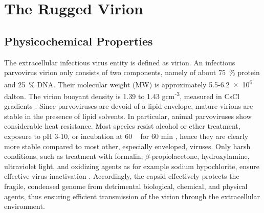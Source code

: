 
\chapter{The Rugged Virion} %

\label{Chapter4} %




\section{Physicochemical Properties}
\label{Physicoprop}
The extracellular infectious virus entity is defined as virion. An infectious parvovirus virion only consists of two components, namely of about 75~\% protein and 25~\% DNA. Their molecular weight (MW) is approximately 5.5-6.2~$\times$~10\textsuperscript{6} dalton. The virion buoyant density is 1.39 to 1.43 gcm\textsuperscript{-3}, measured in CsCl gradients \cite{CsCl, pmid4317344}. Since parvoviruses are devoid of a lipid envelope, mature virions are stable in the presence of lipid solvents. In particular, animal parvoviruses show considerable heat resistance. Most species resist alcohol or ether treatment, exposure to pH 3-10, or incubation at 60 \textcelsius~ for 60 min \cite{pmid12935806, pmid12385412, pmid17880601, pmid19039515, pmid14660623, pmid10941577, pmid10662625}, hence they are clearly more stable compared to most other, especially enveloped, viruses. Only harsh conditions, such as treatment with formalin, $\beta$-propiolacetone, hydroxylamine, ultraviolet light, and oxidizing agents as for example sodium hypochlorite, ensure effective virus inactivation \cite{pmid4213983, pmid3416941, pmid7848502, pmid1520981}. Accordingly, the capsid effectively protects the fragile, condensed genome from detrimental biological, chemical, and physical agents, thus ensuring efficient transmission of the virion through the extracellular environment.     

